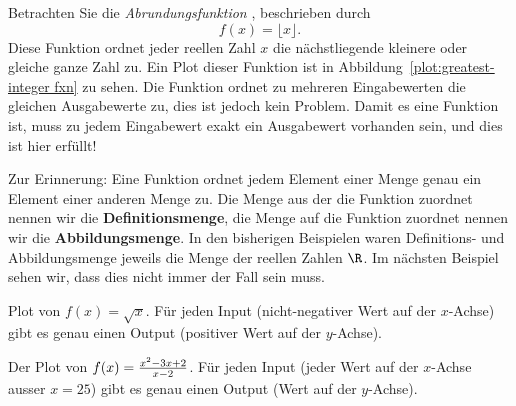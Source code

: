 \begin{example}
Betrachten Sie die \textit{Abrundungsfunktion }, beschrieben durch
\[
f(x) = \lfloor x \rfloor.
\]
Diese Funktion ordnet jeder reellen Zahl $x$ die nächstliegende kleinere oder gleiche ganze Zahl zu. Ein Plot dieser Funktion ist in Abbildung~\ref{plot:greatest-integer fxn} zu sehen. Die Funktion ordnet zu mehreren Eingabewerten die gleichen Ausgabewerte zu, dies ist jedoch kein Problem. Damit es eine Funktion ist, muss zu jedem Eingabewert exakt ein Ausgabewert vorhanden sein, und dies ist hier erfüllt!
\end{example}



Zur Erinnerung: Eine Funktion ordnet jedem Element einer Menge genau ein Element einer anderen Menge zu. Die Menge aus der die Funktion zuordnet nennen wir die \textbf{Definitionsmenge}, die Menge auf die Funktion zuordnet nennen wir die \textbf{Abbildungsmenge}. In den bisherigen Beispielen waren Definitions- und Abbildungsmenge jeweils die Menge der reellen Zahlen $\R$. Im nächsten Beispiel sehen wir, dass dies nicht immer der Fall sein muss.

\begin{marginfigure}[0in]
\caption{Plot von $f(x)=\sqrt{x}$. Für jeden Input (nicht-negativer Wert auf der $x$-Achse) gibt es genau einen Output (positiver Wert auf der $y$-Achse).}
\label{plot:sqrt fxn}
\end{marginfigure}


\begin{marginfigure}[0in]
\caption{Der Plot von $f(x)=\protect\frac{x^2 - 3x + 2}{x-2}$. Für jeden Input (jeder Wert auf der $x$-Achse ausser $x=25$) gibt es genau einen Output (Wert auf der $y$-Achse).}
\label{plot:point undfed fxn}
\end{marginfigure}

